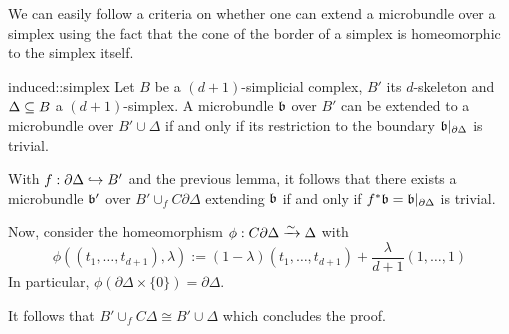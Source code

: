 \begin{myparagraph}
    We can easily follow a criteria on whether
    one can extend a microbundle over a simplex
    using the fact that the cone of the border
    of a simplex is homeomorphic to the simplex itself.
\end{myparagraph}

\begin{mycorollary}{induced::simplex}{}
    Let $B$ be a $(d + 1)$-simplicial complex, $B'$ its $d$-skeleton and $\Delta \subseteq{} B$ a $(d + 1)$-simplex.
    A microbundle $\mathfrak{b}$ over $B'$ can be extended to a microbundle over $B' \cup \Delta$
    if and only if its restriction to the boundary $\mathfrak{b}\vert_{\partial \Delta}$ is trivial.
\end{mycorollary}

\begin{myproof}
    With $f: \partial \Delta \hookrightarrow{} B'$ and the previous lemma,
    it follows that there exists a microbundle $\mathfrak{b}'$ over $B' \cup_f C\partial\Delta$ extending $\mathfrak{b}$
    if and only if $f^*\mathfrak{b} = \mathfrak{b}\vert_{\partial\Delta}$ is trivial.

    Now, consider the homeomorphism $\phi: C\partial \Delta \xrightarrow{\sim} \Delta$ with
    \[ \phi((t_1, \dots, t_{d + 1}), \lambda) := (1 - \lambda) (t_1, \dots, t_{d + 1}) + \frac{\lambda}{d + 1} (1, \dots, 1) \]
    In particular, $\phi(\partial \Delta \times \{0\}) = \partial \Delta$.

    It follows that $B' \cup_f C\Delta \cong B' \cup \Delta$ which concludes the proof.
\end{myproof}